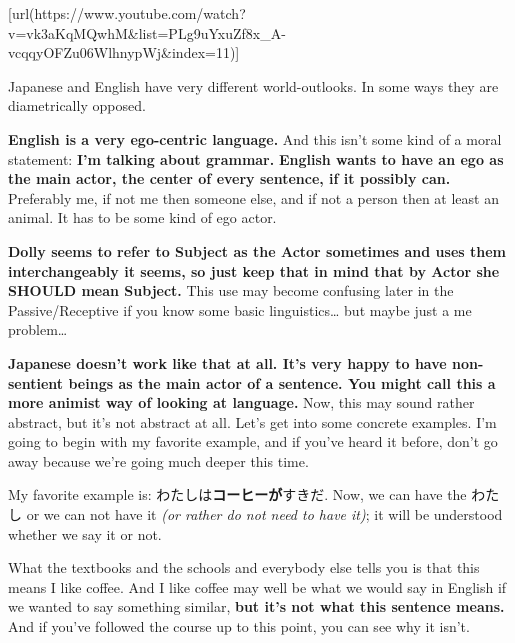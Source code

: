 \startsectionlevel[title={{\bf 9. The Subject of the Japanese Sentence & Expressing Desire: ほしい, たい, たがる}},reference={the-subject-of-the-japanese-sentence-expressing-desire-ほしい-たい-たがる}]

[url(https://www.youtube.com/watch?v=vk3aKqMQwhM&list=PLg9uYxuZf8x_A-vcqqyOFZu06WlhnypWj&index=11)]

\startsectionlevel[title={The Subject and ego in Japanese vs English},reference={the-subject-and-ego-in-japanese-vs-english}]

Japanese and English have very different world-outlooks. In some ways they are diametrically opposed.

{\bf English is a very ego-centric language.} And this isn't some kind of a moral statement: {\bf I'm talking about grammar.} {\bf English wants to have an ego as the main actor, the center of every sentence, if it possibly can.} Preferably me, if not me then someone else, and if not a person then at least an animal. It has to be some kind of ego actor.

{\bf Dolly seems to refer to Subject as the Actor sometimes and uses them interchangeably it seems, so just keep that in mind that by Actor she SHOULD mean Subject.} This use may become confusing later in the Passive/Receptive if you know some basic linguistics\ldots{} but maybe just a me problem\ldots{}

{\bf Japanese doesn't work like that at all. It's very happy to have non-sentient beings as the main actor of a sentence. You might call this a more animist way of looking at language.} Now, this may sound rather abstract, but it's not abstract at all. Let's get into some concrete examples. I'm going to begin with my favorite example, and if you've heard it before, don't go away because we're going much deeper this time.

My favorite example is: わたしは{\bf コーヒーが}すきだ. Now, we can have the わたし or we can not have it {\em (or rather do not need to have it)}; it will be understood whether we say it or not.

{}

What the textbooks and the schools and everybody else tells you is that this means I like coffee. And I like coffee may well be what we would say in English if we wanted to say something similar, {\bf but it's not what this sentence means.} And if you've followed the course up to this point, you can see why it isn't.

